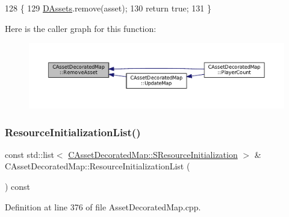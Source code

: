 \begin{DoxyCode}
128                                                                        \{
129     \hyperlink{classCAssetDecoratedMap_a94eeed5b16141169b1ba6cb3842055aa}{DAssets}.remove(asset);
130     \textcolor{keywordflow}{return} \textcolor{keyword}{true};    
131 \}
\end{DoxyCode}
Here is the caller graph for this function\+:\nopagebreak
\begin{figure}[H]
\begin{center}
\leavevmode
\includegraphics[width=350pt]{classCAssetDecoratedMap_a77f46be1ceb30bb83fc3f35c0d58a9a7_icgraph}
\end{center}
\end{figure}
\hypertarget{classCAssetDecoratedMap_a279fb55e5536131b599275e8629d51cd}{}\label{classCAssetDecoratedMap_a279fb55e5536131b599275e8629d51cd} 
\subsubsection{\texorpdfstring{Resource\+Initialization\+List()}{ResourceInitializationList()}}
{\footnotesize\ttfamily const std\+::list$<$ \hyperlink{structCAssetDecoratedMap_1_1SResourceInitialization}{C\+Asset\+Decorated\+Map\+::\+S\+Resource\+Initialization} $>$ \& C\+Asset\+Decorated\+Map\+::\+Resource\+Initialization\+List (\begin{DoxyParamCaption}{ }\end{DoxyParamCaption}) const}



Definition at line 376 of file Asset\+Decorated\+Map.\+cpp.


